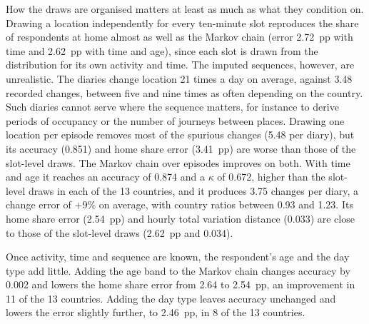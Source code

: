 \documentclass[a4paper]{article}
\begin{document}
How the draws are organised matters at least as much as what they condition on. Drawing a location independently for every ten-minute slot reproduces the share of respondents at home almost as well as the Markov chain (error 2.72~pp with time and 2.62~pp with time and age), since each slot is drawn from the distribution for its own activity and time. The imputed sequences, however, are unrealistic. The diaries change location 21 times a day on average, against 3.48 recorded changes, between five and nine times as often depending on the country. Such diaries cannot serve where the sequence matters, for instance to derive periods of occupancy or the number of journeys between places. Drawing one location per episode removes most of the spurious changes (5.48 per diary), but its accuracy (0.851) and home share error (3.41~pp) are worse than those of the slot-level draws. The Markov chain over episodes improves on both. With time and age it reaches an accuracy of 0.874 and a $\kappa$ of 0.672, higher than the slot-level draws in each of the 13 countries, and it produces 3.75 changes per diary, a change error of $+9\%$ on average, with country ratios between 0.93 and 1.23. Its home share error (2.54~pp) and hourly total variation distance (0.033) are close to those of the slot-level draws (2.62~pp and 0.034).

Once activity, time and sequence are known, the respondent's age and the day type add little. Adding the age band to the Markov chain changes accuracy by 0.002 and lowers the home share error from 2.64 to 2.54~pp, an improvement in 11 of the 13 countries. Adding the day type leaves accuracy unchanged and lowers the error slightly further, to 2.46~pp, in 8 of the 13 countries.
\end{document}
